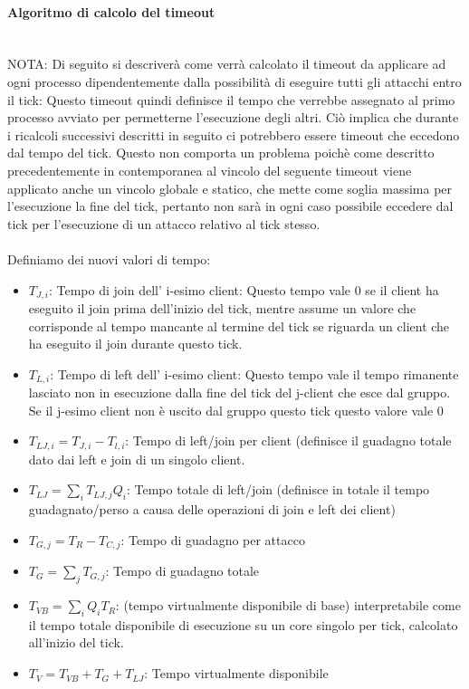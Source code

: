\documentclass[11pt]{article}
\begin{document}
\paragraph{Algoritmo di calcolo del timeout}\mbox{}\\
NOTA: Di seguito si descriverà come verrà calcolato il timeout da applicare ad ogni processo dipendentemente dalla possibilità di eseguire tutti gli attacchi entro il tick: Questo timeout quindi definisce il tempo che verrebbe assegnato al primo processo avviato per permetterne l'esecuzione degli altri. Ciò implica che durante i ricalcoli successivi descritti in seguito ci potrebbero essere timeout che eccedono dal tempo del tick. Questo non comporta un problema poichè come descritto precedentemente in contemporanea al vincolo del seguente timeout viene applicato anche un vincolo globale e statico, che mette come soglia massima per l'esecuzione la fine del tick, pertanto non sarà in ogni caso possibile eccedere dal tick per l'esecuzione di un attacco relativo al tick stesso.\\\\
Definiamo dei nuovi valori di tempo:
\begin{itemize}
	\item $T_{J, i}$: Tempo di join dell' i-esimo client: Questo tempo vale 0 se il client ha eseguito il join prima dell'inizio del tick, mentre assume un valore che corrisponde al tempo mancante al termine del tick se riguarda un client che ha eseguito il join durante questo tick.
	\item $T_{L, i}$: Tempo di left dell' i-esimo client: Questo tempo vale il tempo rimanente lasciato non in esecuzione  dalla fine del tick del j-client che esce dal gruppo. Se il j-esimo client non è uscito dal gruppo questo tick questo valore vale 0
	\item $T_{LJ, i} = T_{J,i}-T_{l,i}$: Tempo di left/join per client (definisce il guadagno totale dato dai left e join di un singolo client.
	\item $T_{LJ} = \sum_{i} T_{LJ,j} Q_i$: Tempo totale di left/join (definisce in totale il tempo guadagnato/perso a causa delle operazioni di join e left dei client)
	\item $T_{G, j} = T_R - T_{C, j}$: Tempo di guadagno per attacco
	\item $T_G = \sum_{j} T_{G,j}$: Tempo di guadagno totale
	\item $T_{VB} = \sum_{i} Q_i T_R$: (tempo virtualmente disponibile di base) interpretabile come il tempo totale disponibile di esecuzione su un core singolo per tick, calcolato all'inizio del tick.
	\item $T_{V} = T_{VB} + T_G + T_{LJ}$: Tempo virtualmente disponibile
\end{itemize}
\end{document}
